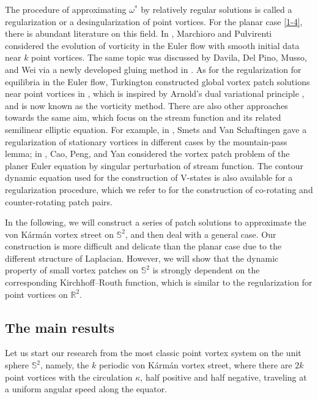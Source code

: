 \documentclass[12pt,reqno]{amsart}
\numberwithin{equation}{section}
\theoremstyle{definition}
\theoremstyle{remark}
\begin{document}
    The procedure of approximating $\omega^*$ by relatively regular solutions is called a regularization or a desingularization of point vortices. 
    For the planar case \eqref{1-4}, there is abundant literature on this field. In \cite{March}, Marchioro and Pulvirenti considered the evolution 
    of vorticity in the Euler flow with smooth initial data near $k$ point vortices. 
    The same topic was discussed by Davila, Del Pino, Musso, and Wei via a newly developed gluing method in \cite{Dav}. 
    As for the regularization for equilibria in the Euler flow, Turkington constructed global vortex patch solutions near point vortices in \cite{T1}, 
    which is inspired by Arnold's dual variational principle \cite{Ar2}, and is now known as the vorticity method. 
    There are also other approaches towards the same aim, which focus on the stream function and its related semilinear elliptic equation. 
    For example, in \cite{SV}, Smets and Van Schaftingen gave a regularization of stationary vortices in different cases by the mountain-pass lemma; 
    in \cite{Cao3}, Cao, Peng, and Yan considered the vortex patch problem of the planer Euler equation by singular perturbation of stream function. 
    The contour dynamic equation used for the construction of V-states is also available for a regularization procedure, which we refer to \cite{HM} 
    for the construction of co-rotating and counter-rotating patch pairs. 
    
    In the following, we will construct a series of patch solutions to approximate the von K\'arm\'an vortex street on $\mathbb S^2$, and then deal 
    with a general case. Our construction is more difficult and delicate than the planar case due to the different structure of Laplacian. 
    However, we will show that the dynamic property of small vortex patches on $\mathbb S^2$ is strongly dependent on the corresponding 
    Kirchhoff--Routh function, which is similar to the regularization for point vortices on $\mathbb R^2$.
  
    \subsection{The main results}
    
    Let us start our research from the most classic point vortex system on the unit sphere $\mathbb S^2$, namely, the $k$ periodic von K\'arm\'an vortex street, 
    where there are $2k$ point vortices with the circulation $\kappa$, half positive and half negative, traveling at a uniform angular speed along the equator. 
    
\end{document}
